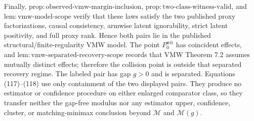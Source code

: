 Finally, \(\mathrm{prop:observed\text{-}vmw\text{-}margin\text{-}inclusion}\), \(\mathrm{prop:two\text{-}class\text{-}witness\text{-}valid}\), and \(\mathrm{lem:vmw\text{-}model\text{-}scope}\) verify that these laws satisfy the two published proxy factorizations, causal consistency, armwise latent ignorability, strict latent positivity, and full proxy rank.  Hence both pairs lie in the published structural/finite-regularity VMW model.  The point \(P_0^{\mathrm{wit}}\) has coincident effects, and \(\mathrm{lem:vmw\text{-}separated\text{-}recovery\text{-}scope}\) records that VMW Theorem 7.2 assumes mutually distinct effects; therefore the collision point is outside that separated recovery regime.  The labeled pair has gap \(g>0\) and is separated.  Equations (117)--(118) use only containment of the two displayed pairs.  They produce no estimator or confidence procedure on either enlarged comparator class, so they transfer neither the gap-free modulus nor any estimator upper, confidence, cluster, or matching-minimax conclusion beyond \(\mathcal M\) and \(\mathcal M(g)\).
